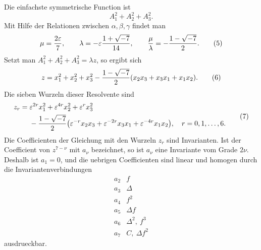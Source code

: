 \documentclass[11pt]{article}
\newcommand{\eps}{\varepsilon}
\begin{document}
Die einfachste symmetrische Function ist
\begin{equation}
A_1^2+A_2^2+A_3^2.
\tag{4}
\end{equation}
Mit Hilfe der Relationen zwischen \(\alpha,\beta,\gamma\) findet man
\begin{equation}
\mu={2\eps\over7},\qquad
\lambda=-\eps {1+\sqrt{-7}\over14},\qquad {\mu\over\lambda}=-{1-\sqrt{-7}\over2}.
\tag{5}
\end{equation}
Setzt man \(A_1^2+A_2^2+A_3^2=\lambda z\), so ergibt sich
\begin{equation}
z=x_1^2+x_2^2+x_3^2-{1-\sqrt{-7}\over2}(x_2x_3+x_3x_1+x_1x_2).
\tag{6}
\end{equation}
Die sieben Wurzeln dieser Resolvente sind
\begin{equation}
\begin{aligned}
z_r={}&\eps^{2r}x_1^2+\eps^{4r}x_2^2+\eps^rx_3^2\\
&-{1-\sqrt{-7}\over2}\bigl(\eps^{-r}x_2x_3+\eps^{-2r}x_3x_1+\eps^{-4r}x_1x_2\bigr),\quad r=0,1,\ldots,6.
\end{aligned}
\tag{7}
\end{equation}
Die Coefficienten der Gleichung mit den Wurzeln \(z_r\) sind Invarianten. Ist der Coefficient von \(z^{7-\nu}\) mit \(a_\nu\) bezeichnet, so ist \(a_\nu\) eine Invariante vom Grade \(2\nu\). Deshalb ist \(a_1=0\), und die uebrigen Coefficienten sind linear und homogen durch die Invariantenverbindungen
\begin{equation}
\begin{array}{c|c}
a_2&f\\
a_3&\Delta\\
a_4&f^2\\
a_5&\Delta f\\
a_6&\Delta^2,\ f^3\\
a_7&C,\ \Delta f^2
\end{array}
\tag{8}
\end{equation}
ausdrueckbar.
\end{document}
